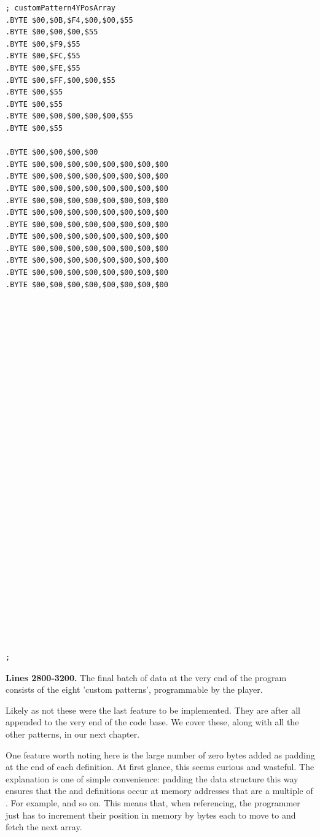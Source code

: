 \begin{minipage}[b]{0.33\linewidth}
\begin{lrbox}{\mybox}
\begin{lstlisting}[basicstyle=\ttfamily\tiny]
; customPattern4YPosArray
.BYTE $00,$0B,$F4,$00,$00,$55
.BYTE $00,$00,$00,$55
.BYTE $00,$F9,$55
.BYTE $00,$FC,$55
.BYTE $00,$FE,$55
.BYTE $00,$FF,$00,$00,$55
.BYTE $00,$55
.BYTE $00,$55
.BYTE $00,$00,$00,$00,$00,$55
.BYTE $00,$55

.BYTE $00,$00,$00,$00
.BYTE $00,$00,$00,$00,$00,$00,$00,$00
.BYTE $00,$00,$00,$00,$00,$00,$00,$00
.BYTE $00,$00,$00,$00,$00,$00,$00,$00
.BYTE $00,$00,$00,$00,$00,$00,$00,$00
.BYTE $00,$00,$00,$00,$00,$00,$00,$00
.BYTE $00,$00,$00,$00,$00,$00,$00,$00
.BYTE $00,$00,$00,$00,$00,$00,$00,$00
.BYTE $00,$00,$00,$00,$00,$00,$00,$00
.BYTE $00,$00,$00,$00,$00,$00,$00,$00
.BYTE $00,$00,$00,$00,$00,$00,$00,$00
.BYTE $00,$00,$00,$00,$00,$00,$00,$00






























;
\end{lstlisting}
\end{lrbox}%
\scalebox{0.8}{\usebox{\mybox}}
\end{minipage}
\textbf{Lines 2800-3200.} The final batch of data at the very end of the program consists of the
eight 'custom patterns', programmable by the player.

Likely as not these were the last feature to be implemented. They are after all appended to the very
end of the code base. We cover these, along with all the other patterns, in our next chapter. 

One feature worth noting here is the large number of zero bytes added as padding at the end of each 
definition. At first glance, this seems curious and wasteful. The explanation is one of simple convenience:
padding the data structure this way ensures that the  and  definitions occur at memory
addresses that are a multiple of . For example,  and so on.
This means that, when referencing, the programmer just
has to increment their position in memory by  bytes each to move to and fetch the next array.

